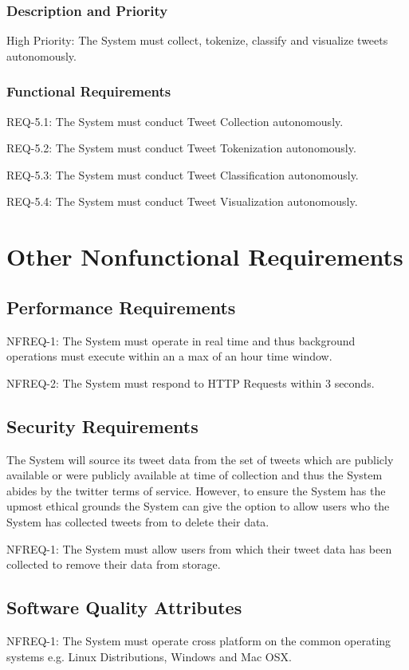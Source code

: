 \documentclass[11pt]{report}
\begin{document}
\subsubsection*{Description and Priority}
High Priority: The System must collect, tokenize, classify and visualize tweets autonomously.

\subsubsection*{Functional Requirements}
REQ-5.1: The System must conduct Tweet Collection autonomously.

REQ-5.2: The System must conduct Tweet Tokenization autonomously.

REQ-5.3: The System must conduct Tweet Classification autonomously.

REQ-5.4: The System must conduct Tweet Visualization autonomously.


\section*{Other Nonfunctional Requirements}
\subsection*{Performance Requirements}
NFREQ-1: The System must operate in real time and thus background operations must execute within an a max of an hour time window. 

NFREQ-2: The System must respond to HTTP Requests within 3 seconds.

\subsection*{Security Requirements}
The System will source its tweet data from the set of tweets which are publicly available or were publicly available at time of collection and thus the System abides by the twitter terms of service. However, to ensure the System has the upmost ethical grounds the System can give the option to allow users who the System has collected tweets from to delete their data.

NFREQ-1: The System must allow users from which their tweet data has been collected to remove their data from storage.

\subsection*{Software Quality Attributes}
NFREQ-1: The System must operate cross platform on the common operating systems e.g. Linux Distributions, Windows and Mac OSX.
\end{document}
